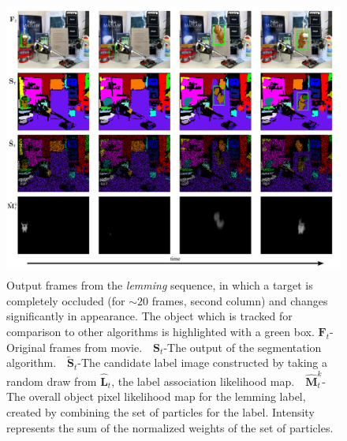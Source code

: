 
\begin{figure}[t]
\includegraphics[height=9.2cm,width=12cm]{figures/ECCV2012/Tracking.pdf}
  \caption[Tracked output from lemming sequence]{Output frames from the \textit{lemming} sequence, in which a target is completely occluded (for $\sim20$ frames, second column) and changes significantly in appearance. The object which is tracked for comparison to other algorithms is highlighted with a green box. $\mathbf{F}_t$-Original frames from  movie.~~$\mathbf{S}_t$-The output of the segmentation algorithm.~~$\tilde{\mathbf{S}}_{t}$-The candidate label image constructed by taking a random draw from $\mathbf{\hat{L}}_{t}$, the label association likelihood map.~~$\mathbf{\hat{M}}^k_{t}$-The overall object pixel likelihood map for the lemming label, created by combining the set of particles for the label. Intensity represents the sum of the normalized weights of the set of particles.}
\label{fig:Results}
\end{figure}

